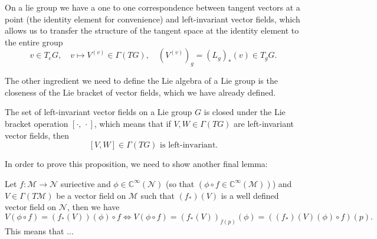 On a lie group we have a one to one correspondence between tangent vectors at a point (the identity element for convenience) and left-invariant vector fields, which allows us to transfer the structure of the tangent space at the identity element to the entire group
\[
    v \in T_e G, \quad v \mapsto V^{(v)} \in \Gamma(TG), \quad (V^{(v)})_g = (L_g)_* (v) \in T_g G.
\]

The other ingredient we need to define the Lie algebra of a Lie group is the closeness of the Lie bracket of vector fields, which we have already defined.

\begin{proposition}
    The set of left-invariant vector fields on a Lie group \(G\) is closed under the Lie bracket operation \([\cdot,\,\cdot]\), which means that if \(V, W \in \Gamma(TG)\) are left-invariant vector fields, then
    \[
        [V,W] \in \Gamma(TG) \text{ is left-invariant}.
    \]
\end{proposition}

In order to prove this proposition, we need to show another final lemma:

\begin{lemma}
    Let \(f : \mathcal{M} \to \mathcal{N}\) suriective and \(\phi \in \mathbb{C}^\infty(\mathcal{N})\) (so that \((\phi \circ f \in \mathbb{C}^\infty(\mathcal{M}))\)) and \(V \in \Gamma(T\mathcal{M})\) be a vector field on \(\mathcal{M}\) such that \((f_*)(V)\) is a well defined vector field on \(\mathcal{N}\), then we have
    \[
        V(\phi \circ f) = (f_*(V))(\phi) \circ f \iff V(\phi \circ f) = (f_*(V))_{f(p)} (\phi) = ((f_*)(V)(\phi) \circ f)(p).
    \]
    This means that ...
\end{lemma}

